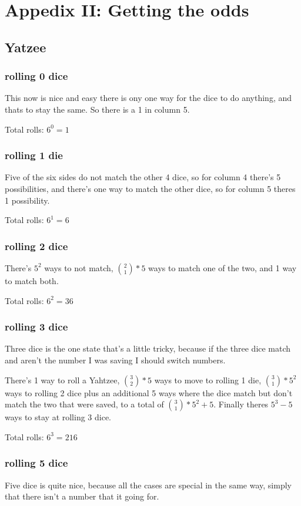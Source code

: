 \section{Appedix II: Getting the odds}

\subsection{Yatzee}

\subsubsection{rolling 0 dice}
This now is nice and easy there is ony one way for the dice to do anything, and thats to stay the same. So there is a 1 in column 5.

Total rolls: $6^0=1$
\subsubsection{rolling 1 die}
Five of the six sides do not match the other 4 dice, so for column 4 there's 5 possibilities, and there's one way to match the other dice, so for column 5 theres 1 possibility.

Total rolls: $6^1=6$
\subsubsection{rolling 2 dice}
There's $5^2$ ways to not match, ${2 \choose 1}*5$ ways to match one of the two, and 1 way to match both.

Total rolls: $6^2=36$
\subsubsection{rolling 3 dice}
Three dice is the one state that's a little tricky, because if the three dice match and aren't the number I was saving I should switch numbers. 

There's 1 way to roll a Yahtzee, ${3 \choose 2}*5$ ways to move to rolling 1 die, ${3 \choose 1}*5^2$ ways to rolling 2 dice plus an additional 5 ways where the dice match but don't match the two that were saved, to a total of ${3 \choose 1}*5^2+5$. Finally theres $5^3-5$ ways to stay at rolling 3 dice. 

Total rolls: $6^3=216$

\subsubsection{rolling 5 dice}
Five dice is quite nice, because all the cases are special in the same way, simply that there isn't a number that it going for. 

